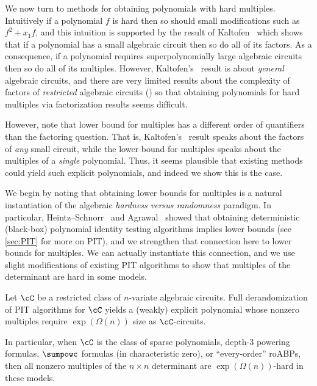 \documentclass{toc}
\begin{document}
We now turn to methods for obtaining polynomials with hard multiples. Intuitively if a polynomial $f$ is hard then so should small modifications such as $f^2+x_1f$, and this intuition is supported by the result of Kaltofen~\cite{Kaltofen89} which shows that if a polynomial has a small algebraic circuit then so do all of its factors.  As a consequence, if a polynomial requires superpolynomially large algebraic circuits then so do all of its multiples. However, Kaltofen's~\cite{Kaltofen89} result is about \emph{general} algebraic circuits, and there are very limited results about the complexity of factors of \emph{restricted} algebraic circuits (\cite{DvirSY09,Oliveira15}) so that obtaining polynomials for hard multiples via factorization results seems difficult. %

However, note that lower bound for multiples has a different order of quantifiers than the factoring question.  That is, Kaltofen's~\cite{Kaltofen89} result speaks about the factors of \emph{any} small circuit, while the lower bound for multiples speaks about the multiples of a \emph{single} polynomial.  Thus, it seems plausible that existing methods could yield such explicit polynomials, and indeed we show this is the case.

We begin by noting that obtaining lower bounds for multiples is a natural instantiation of the algebraic \emph{hardness versus randomness} paradigm. In particular, Heintz--Schnorr~\cite{HeintzSchnorr80} and Agrawal~\cite{Agrawal05} showed that obtaining deterministic (black-box) polynomial identity testing algorithms implies lower bounds (see \autoref{sec:PIT} for more on PIT), and we strengthen that connection here to lower bounds for multiples.  We can actually instantiate this connection, and we use slight modifications of existing PIT algorithms to show that multiples of the determinant are hard in some models.

\begin{theorem}
        Let $\cC$ be a restricted class of $n$-variate algebraic circuits. Full derandomization of PIT algorithms for $\cC$ yields a (weakly) explicit polynomial whose nonzero multiples require
%
$\exp(\Omega(n))$ size as $\cC$-circuits.

        In particular, when $\cC$ is the class of sparse polynomials, depth-3 powering formulas, $\sumpowc$ formulas (in characteristic zero), or ``every-order'' roABPs, then all nonzero multiples of the $n\times n$ determinant are $\exp(\Omega(n))$-hard in these models.
\end{theorem}
\end{document}
